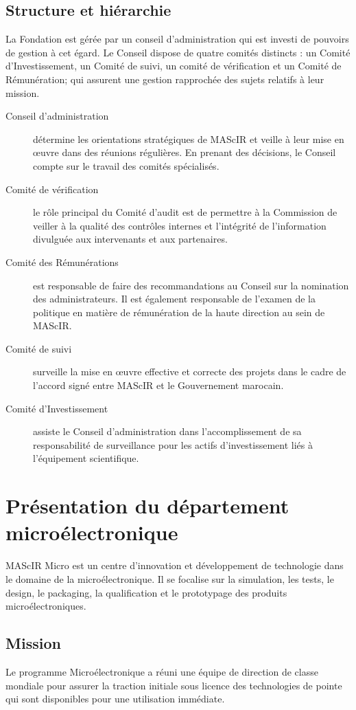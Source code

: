 \documentclass[11pt, a4paper, twoside]{book}
\begin{document}
\subsection{Structure et hiérarchie}
La Fondation est gérée par un conseil d’administration qui est investi de pouvoirs de gestion à cet égard. Le Conseil dispose de quatre comités distincts : un Comité d’Investissement, un Comité de suivi, un comité de vérification et un Comité de Rémunération; qui assurent une gestion rapprochée des sujets relatifs à leur mission.
\begin{description}
\item[Conseil d'administration] détermine les orientations stratégiques de MAScIR et veille à leur mise en œuvre dans des réunions régulières. En prenant des décisions, le Conseil compte sur le travail des comités spécialisés.
\item[Comité de vérification] le rôle principal du Comité d'audit est de permettre à la Commission de veiller à la qualité des contrôles internes et l'intégrité de l'information divulguée aux intervenants et aux partenaires.
\item[Comité des Rémunérations] est responsable de faire des recommandations au Conseil sur la nomination des administrateurs. Il est également responsable de l'examen de la politique en matière de rémunération de la haute direction au sein de MAScIR.
\item[Comité de suivi] surveille la mise en œuvre effective et correcte des projets dans le cadre de l'accord signé entre MAScIR et le Gouvernement marocain.
\item[Comité d'Investissement] assiste le Conseil d'administration dans l'accomplissement de sa responsabilité de surveillance pour les actifs d'investissement liés à l'équipement scientifique.
\end{description}

\section{Présentation du département microélectronique}
MAScIR Micro est un centre d’innovation et développement de technologie dans le domaine de la microélectronique. Il se focalise sur la simulation, les tests, le design, le packaging, la qualification et le prototypage des produits microélectroniques.
\subsection{Mission}
Le programme Microélectronique a réuni une équipe de direction de classe mondiale pour assurer la traction initiale sous licence des technologies de pointe qui sont disponibles pour une utilisation immédiate. \\
\end{document}
